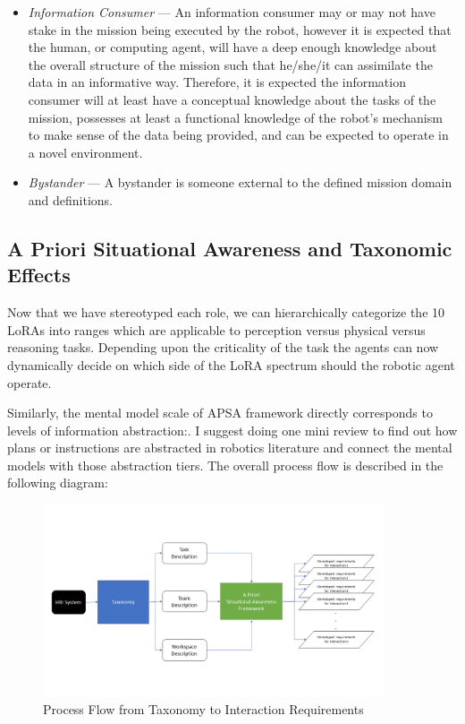 \documentclass[letterpaper, 10 pt, conference]{ieeeconf} %
\theoremstyle{definition} \newtheorem{definition}{Definition}
\begin{document}
\begin{itemize}{}
  \item \textit{Information Consumer} --- An information consumer may or may not
        have stake in the mission being executed by the robot, however it is
        expected that the human, or computing agent, will have a deep enough
        knowledge about the overall structure of the mission such that he/she/it can
        assimilate the data in an informative way. Therefore, it is expected the
        information consumer will at least have a conceptual knowledge about the
        tasks of the mission, possesses at least a functional knowledge of the
        robot's mechanism to make sense of the data being provided, and can be
        expected to operate in a novel environment.
  \item \textit{Bystander} --- A bystander is someone external to the defined
        mission domain and definitions.
\end{itemize}

\subsection{A Priori Situational Awareness and Taxonomic Effects}

Now that we have stereotyped each role, we can hierarchically categorize the 10
LoRAs into ranges which are applicable to perception versus physical versus
reasoning tasks. Depending upon the criticality of the task the agents can now
dynamically decide on which side of the LoRA spectrum should the robotic agent
operate.

Similarly, the mental model scale of APSA framework directly corresponds to
levels of information abstraction:. I suggest doing one mini review to find out
how plans or instructions are abstracted in robotics literature and connect the
mental models with those abstraction tiers. The overall process flow is
described in the following diagram:

\begin{figure}[t!]
  \includegraphics[width=0.9\textwidth]{apsa.png}
  \caption{Process Flow from Taxonomy to Interaction Requirements}
\end{figure}
\end{document}
